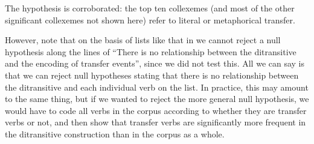 \begin{table}
\caption{The verbs in the ditransitive construction (ICE\hyp{}GB, \citet[229]{stefanowitsch_collostructions:_2003})}
\label{tab:verbsditransitive}
\end{table}

The hypothesis is corroborated: the top ten collexemes (and most of the other significant collexemes not shown here) refer to literal  or metaphorical transfer.

However, note that on the basis of lists like that in  we cannot reject a null hypothesis along the lines of ``There is no relationship between the ditransitive  and the encoding of transfer events'', since we did not test this. All we can say is that we can reject null hypotheses stating that there is no relationship between the ditransitive and each individual verb  on the list. In practice, this may amount to the same thing, but if we wanted to reject the more general null hypothesis, we would have to code  all verbs  in the corpus according to whether they are transfer verbs or not, and then show that transfer verbs are significantly more frequent in the ditransitive  construction than in the corpus as a whole.

